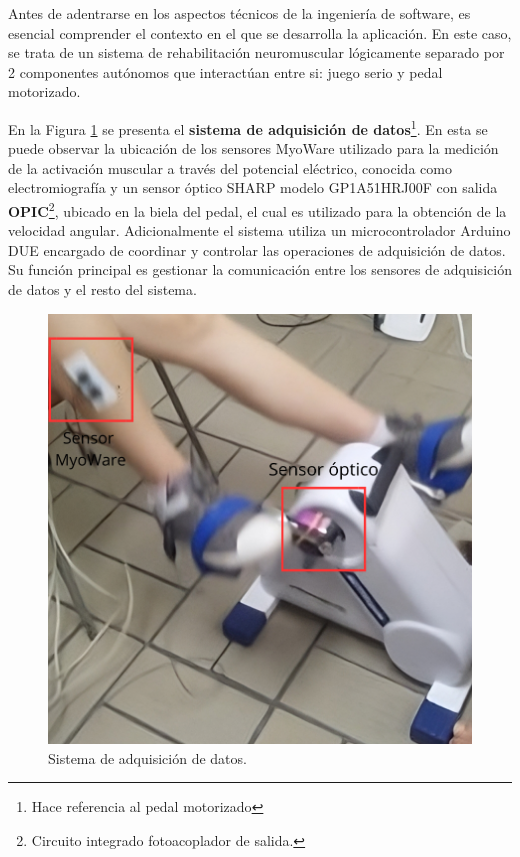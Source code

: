 Antes de adentrarse en los aspectos técnicos de la ingeniería de software, es esencial comprender el contexto en el que se desarrolla la aplicación. En este caso, se trata de un sistema de rehabilitación neuromuscular lógicamente separado por 2 componentes autónomos que interactúan entre si: juego serio y pedal motorizado. 

En la Figura \ref{fig: sa} se presenta el \textbf{sistema de adquisición de datos}\footnote{Hace referencia al pedal motorizado}. En esta se puede observar la ubicación de los sensores MyoWare  utilizado para la medición de la activación muscular a través del potencial eléctrico, conocida como electromiografía y un sensor óptico SHARP modelo GP1A51HRJ00F con salida  \textbf{OPIC}\footnote{Circuito integrado fotoacoplador de salida.}, ubicado en la biela del pedal, el cual es utilizado para la obtención de la velocidad angular. Adicionalmente el sistema utiliza un microcontrolador Arduino DUE encargado de coordinar y controlar las operaciones de adquisición de datos. Su función principal es gestionar la comunicación entre los sensores de adquisición de datos y el resto del sistema.

\begin{figure}[ht]
    \centering
    \includegraphics[scale=0.25]{images/sa.png}
    \caption{Sistema de adquisición de datos.}
    \label{fig: sa}
\end{figure}    

